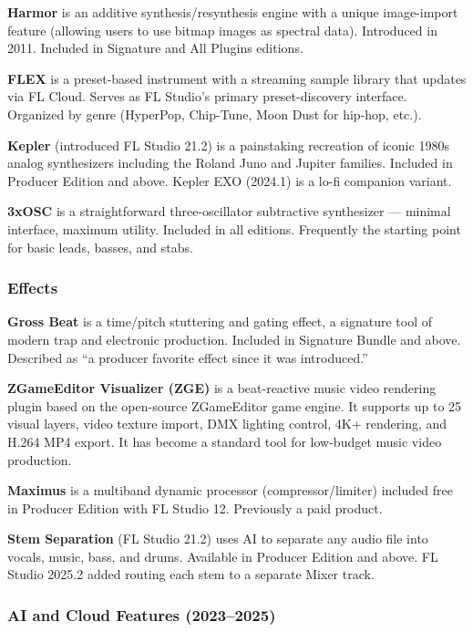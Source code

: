 \documentclass[11pt,letterpaper]{article}
\begin{document}
\textbf{Harmor} is an additive synthesis/resynthesis engine with a unique image-import feature (allowing users to use bitmap images as spectral data). Introduced in 2011. Included in Signature and All Plugins editions.

\textbf{FLEX} is a preset-based instrument with a streaming sample library that updates via FL Cloud. Serves as FL Studio's primary preset-discovery interface. Organized by genre (HyperPop, Chip-Tune, Moon Dust for hip-hop, etc.).

\textbf{Kepler} (introduced FL Studio 21.2) is a painstaking recreation of iconic 1980s analog synthesizers including the Roland Juno and Jupiter families. Included in Producer Edition and above. Kepler EXO (2024.1) is a lo-fi companion variant.

\textbf{3xOSC} is a straightforward three-oscillator subtractive synthesizer --- minimal interface, maximum utility. Included in all editions. Frequently the starting point for basic leads, basses, and stabs.

\subsubsection{Effects}

\textbf{Gross Beat} is a time/pitch stuttering and gating effect, a signature tool of modern trap and electronic production. Included in Signature Bundle and above. Described as ``a producer favorite effect since it was introduced.''

\textbf{ZGameEditor Visualizer (ZGE)} is a beat-reactive music video rendering plugin based on the open-source ZGameEditor game engine. It supports up to 25 visual layers, video texture import, DMX lighting control, 4K+ rendering, and H.264 MP4 export. It has become a standard tool for low-budget music video production.

\textbf{Maximus} is a multiband dynamic processor (compressor/limiter) included free in Producer Edition with FL Studio 12. Previously a paid product.

\textbf{Stem Separation} (FL Studio 21.2) uses AI to separate any audio file into vocals, music, bass, and drums. Available in Producer Edition and above. FL Studio 2025.2 added routing each stem to a separate Mixer track.

\subsubsection{AI and Cloud Features (2023--2025)}
\end{document}
